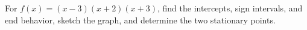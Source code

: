 For $f(x)=(x-3)(x+2)(x+3)$, find the intercepts, sign intervals, and end behavior, sketch the graph, and determine the two stationary points.
